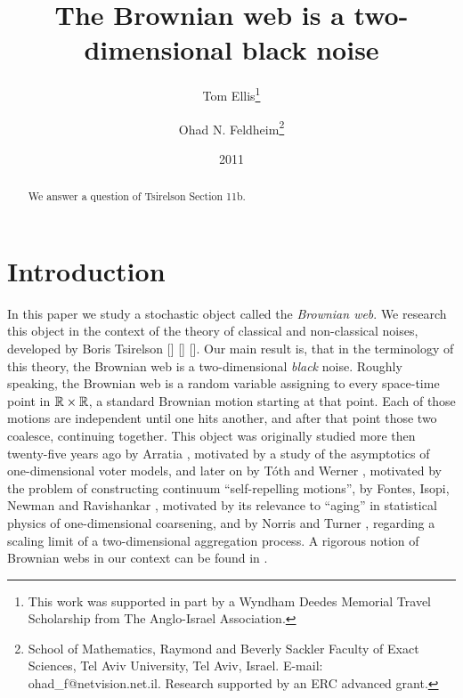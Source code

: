 \newcommand{\sigfield}{$\sigma$-field}
{
\title{The Brownian web is a two-dimensional black noise}

\newcommand{\tomthanks}{This work was supported in part by
a Wyndham Deedes Memorial Travel Scholarship from The Anglo-Israel
Association.}

\newcommand{\ohadthanks}{School of Mathematics, Raymond and Beverly Sackler Faculty of Exact
Sciences, Tel Aviv University, Tel Aviv, Israel. E-mail:
ohad\_f@netvision.net.il. Research supported by an ERC advanced grant.}

\author{Tom Ellis\thanks{\tomthanks}\\%
\and Ohad N. Feldheim\thanks{\ohadthanks}}

\date{2011}

\maketitle

\begin{abstract}
We answer a question of
Tsirelson \cite{tsirelson-nonclassical-stochastic-flows} Section 11b.

\end{abstract}

\section{Introduction}
In this paper we study a stochastic object called the \emph{Brownian web}. We
research this object in the context of the theory of classical and
non-classical noises, developed by Boris Tsirelson [] [] []. Our main result
is, that in the terminology of this theory, the Brownian web is a
two-dimensional \emph{black} noise.
Roughly speaking, the Brownian web is a random variable assigning to
every space-time point in $\mathbb{R}\times\mathbb{R}$, a standard Brownian motion starting
at that point. Each of those motions are independent until one hits another,
and after that point those two coalesce, continuing together. This object was
originally studied more then twenty-five years ago by Arratia \cite{arratia}, motivated
by a study of the asymptotics of one-dimensional voter models, and later on
by T\'{o}th and Werner \cite{toth-werner},
motivated by the problem of constructing continuum
``self-repelling motions'', by Fontes, Isopi, Newman and Ravishankar
\cite{fontes-et-al},
motivated by its relevance to ``aging'' in statistical physics of
one-dimensional coarsening, and by Norris and Turner
\cite{norris-turner-convergence-to-bw},\cite{norris-turner-planar-aggregation}
regarding a scaling limit of a two-dimensional aggregation process.
A rigorous notion of Brownian webs in our context
can be found in .

}

